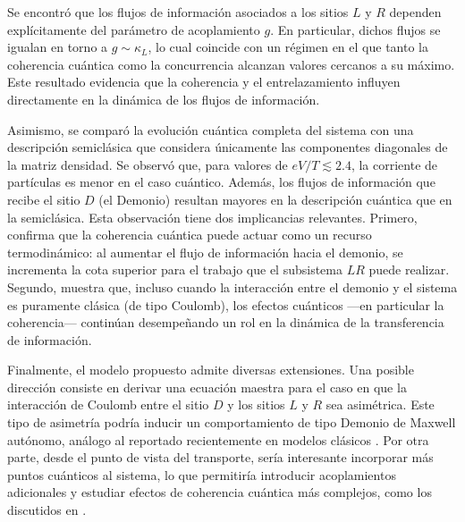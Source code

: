 Se encontró que los flujos de información asociados a los sitios $L$ y $R$ dependen explícitamente del parámetro de acoplamiento $g$. En particular, dichos flujos se igualan en torno a $g \sim \kappa_L$, lo cual coincide con un régimen en el que tanto la coherencia cuántica como la concurrencia alcanzan valores cercanos a su máximo. Este resultado evidencia que la coherencia y el entrelazamiento influyen directamente en la dinámica de los flujos de información.

Asimismo, se comparó la evolución cuántica completa del sistema con una descripción semiclásica que considera únicamente las componentes diagonales de la matriz densidad. Se observó que, para valores de $eV/T \lesssim 2.4$, la corriente de partículas es menor en el caso cuántico. Además, los flujos de información que recibe el sitio $D$ (el Demonio) resultan mayores en la descripción cuántica que en la semiclásica. Esta observación tiene dos implicancias relevantes. Primero, confirma que la coherencia cuántica puede actuar como un recurso termodinámico: al aumentar el flujo de información hacia el demonio, se incrementa la cota superior para el trabajo que el subsistema $LR$ puede realizar. Segundo, muestra que, incluso cuando la interacción entre el demonio y el sistema es puramente clásica (de tipo Coulomb), los efectos cuánticos —en particular la coherencia— continúan desempeñando un rol en la dinámica de la transferencia de información.

Finalmente, el modelo propuesto admite diversas extensiones. Una posible dirección consiste en derivar una ecuación maestra para el caso en que la interacción de Coulomb entre el sitio $D$ y los sitios $L$ y $R$ sea asimétrica. Este tipo de asimetría podría inducir un comportamiento de tipo Demonio de Maxwell autónomo, análogo al reportado recientemente en modelos clásicos \cite{monsel2025autonomous}. Por otra parte, desde el punto de vista del transporte, sería interesante incorporar más puntos cuánticos al sistema, lo que permitiría introducir acoplamientos adicionales y estudiar efectos de coherencia cuántica más complejos, como los discutidos en \cite{khandelwal2025maximal}.





